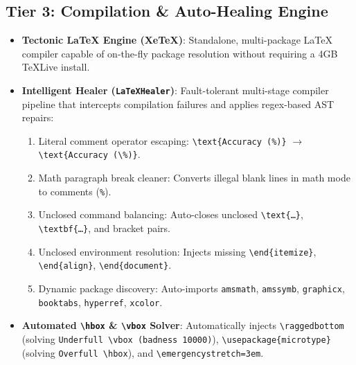\documentclass[11pt,a4paper]{article}
\begin{document}
\subsection{Tier 3: Compilation \& Auto-Healing Engine}
\begin{itemize}[leftmargin=1.5em]
    \item \textbf{Tectonic LaTeX Engine (XeTeX)}: Standalone, multi-package LaTeX compiler capable of on-the-fly package resolution without requiring a 4GB TeXLive install.
    \item \textbf{Intelligent Healer (\texttt{LaTeXHealer})}: Fault-tolerant multi-stage compiler pipeline that intercepts compilation failures and applies regex-based AST repairs:
    \begin{enumerate}
        \item Literal comment operator escaping: \texttt{\textbackslash text\{Accuracy (\%)\}} $\rightarrow$ \texttt{\textbackslash text\{Accuracy (\textbackslash\%)\}}.
        \item Math paragraph break cleaner: Converts illegal blank lines in math mode to comments (\texttt{\%}).
        \item Unclosed command balancing: Auto-closes unclosed \texttt{\textbackslash text\{\dots\}}, \texttt{\textbackslash textbf\{\dots\}}, and bracket pairs.
        \item Unclosed environment resolution: Injects missing \texttt{\textbackslash end\{itemize\}}, \texttt{\textbackslash end\{align\}}, \texttt{\textbackslash end\{document\}}.
        \item Dynamic package discovery: Auto-imports \texttt{amsmath}, \texttt{amssymb}, \texttt{graphicx}, \texttt{booktabs}, \texttt{hyperref}, \texttt{xcolor}.
    \end{enumerate}
    \item \textbf{Automated \texttt{\textbackslash hbox} \& \texttt{\textbackslash vbox} Solver}: Automatically injects \texttt{\textbackslash raggedbottom} (solving \texttt{Underfull \textbackslash vbox (badness 10000)}), \texttt{\textbackslash usepackage\{microtype\}} (solving \texttt{Overfull \textbackslash hbox}), and \texttt{\textbackslash emergencystretch=3em}.
\end{itemize}
\end{document}
